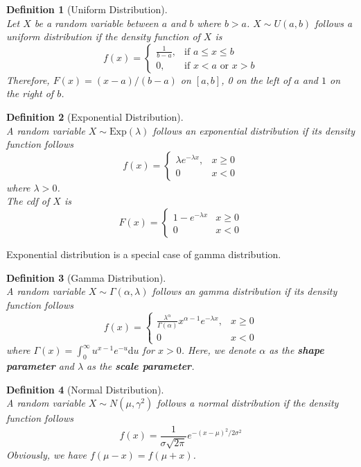 \documentclass[12pt]{article}
\newcommand{\diff}{\mathrm{d}}
\newcommand{\expo}{\mathrm{Exp}}
\newtheorem{definition}{Definition}[section]
\theoremstyle{definition}
\begin{document}
\begin{definition}[Uniform Distribution]
\hfill\\\normalfont Let $X$ be a random variable between $a$ and $b$ where $b>a$. $X\sim U(a,b)$ follows a uniform distribution if the density function of $X$ is
\[
f(x)=\begin{cases}
\frac{1}{b-a},&\text{if } a\leq x\leq b\\
0,\;\;\;      &\text{if } x<a\text{ or }x>b
\end{cases}
\]
Therefore, $F(x) = (x-a)/(b-a) $ on $[a,b]$, 0 on the left of $a$ and $1$ on the right of $b$.
\end{definition}
\begin{definition}[Exponential Distribution]
\hfill\\\normalfont A random variable $X\sim\expo(\lambda)$ follows an exponential distribution if its density function follows
\[
f(x)=\begin{cases}
\lambda e^{-\lambda x}, &x\geq 0\\
0 &x<0
\end{cases}
\]
where $\lambda>0$.\\
The cdf of $X$ is
\[
F(x) = \begin{cases}
1-e^{-\lambda x} & x\geq 0\\
0 & x<0
\end{cases}
\]
\end{definition}
Exponential distribution is a special case of gamma distribution.
\begin{definition}[Gamma Distribution]
\hfill\\\normalfont A random variable $X\sim\Gamma(\alpha, \lambda)$ follows an gamma distribution if its density function follows
\[
f(x) = \begin{cases} \frac{\lambda^\alpha}{\Gamma(\alpha)} x^{\alpha-1}e^{-\lambda x}, &x\geq 0\\
0 & x<0
\end{cases}
\]
where $\Gamma(x) = \int_0^\infty u^{x-1}e^{-u}\diff u$ for $x>0$.
Here, we denote $\alpha$ as the \textbf{shape parameter} and $\lambda$ as the \textbf{scale parameter}.
\end{definition}
\begin{definition}[Normal Distribution]
\hfill\\\normalfont A random variable $X\sim N(\mu, \gamma^2)$ follows a normal distribution if the density function follows
\[
f(x) = \frac{1}{\sigma \sqrt{2\pi}} e^{-(x-\mu)^2/2\sigma^2}
\]
Obviously, we have $f(\mu-x) = f(\mu+x)$.
\end{definition}
\end{document}
